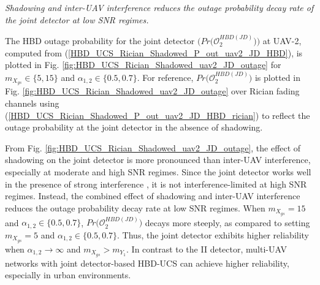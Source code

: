 
\begin{observation}
\emph{\emph{Shadowing and inter-UAV interference reduces the outage probability decay rate of the joint detector at low SNR regimes.}
}\end{observation}

The HBD outage probability for the joint detector $\big(Pr\big(\mathcal{O}_{2}^{HBD(JD)}\big)\big)$ at UAV-2, computed from (\ref{HBD_UCS_Rician_Shadowed_P_out_uav2_JD_HBD}), is plotted in Fig. \ref{fig:HBD_UCS_Rician_Shadowed_uav2_JD_outage} for $m_{X_{gs}} \in \{5, 15\}$ and $\alpha_{1,2} \in \{0.5, 0.7\}$. For reference, $Pr\big(\mathcal{O}_{2}^{HBD(JD)}\big)$ is plotted in Fig. \ref{fig:HBD_UCS_Rician_Shadowed_uav2_JD_outage} over Rician fading channels using (\ref{HBD_UCS_Rician_Shadowed_P_out_uav2_JD_HBD_rician}) to reflect the outage probability at the joint detector in the absence of shadowing. 

From Fig. \ref{fig:HBD_UCS_Rician_Shadowed_uav2_JD_outage}, the effect of shadowing on the joint detector is more pronounced than inter-UAV interference, especially at moderate and high SNR regimes. Since the joint detector works well in the presence of strong interference \cite{zahavi2017cooperation,zhou2015mac,shubhi2017joint,blomer2009transmission}, it is not interference-limited at high SNR regimes. Instead, the combined effect of shadowing and inter-UAV interference reduces the outage probability decay rate at low SNR regimes. When $m_{X_{gs}} = 15$ and $\alpha_{1,2} \in \{0.5, 0.7\}$, $Pr\big(\mathcal{O}_{2}^{HBD(JD)}\big)$ decays more steeply, as compared to setting $m_{X_{gs}} = 5$ and $\alpha_{1,2} \in \{0.5, 0.7\}$. Thus, the joint detector exhibits higher reliability when $\alpha_{1,2} \to \infty$ and $m_{X_{gs}} > m_{Y_1}$. In contrast to the II detector, multi-UAV networks with joint detector-based HBD-UCS can achieve higher reliability, especially in urban environments.


